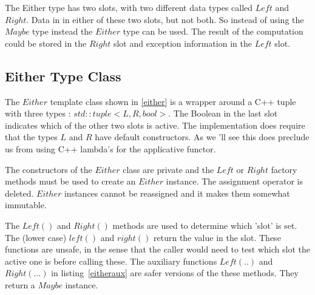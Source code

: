 \documentclass[12pt,fleqn]{article}
\begin{document}
The Either type has two slots, with two different data types called $Left$ and $Right$. 
Data in in either of these two slots, but not both.
So instead of using the $Maybe$ type instead the $Either$ type can be used. 
The result of the computation could be stored in the $Right$ slot and exception information in the $Left$ slot.

\subsection{Either Type Class}
%
%
%

The $Either$ template class shown in \ref{either} is a wrapper around a C++ tuple with three types : $std::tuple<L,R,bool>$.
The Boolean in the last slot indicates which of the other two slots is active.
The implementation does require that the types $L$ and $R$ have default constructors.
As we 'll see this does preclude us from using C++ lambda's for the applicative functor.

The constructors of the $Either$ class are private and the $Left$ or $Right$ factory methods must be used to create an $Either$ instance.
The assignment operator is deleted. 
$Either$ instances cannot be reassigned and it makes them somewhat immutable.

The $Left()$ and $Right()$ methods are used to determine which 'slot' is set.
The (lower case) $left()$ and $right()$ return the value in the slot.
These functions are unsafe, in the sense that the caller would need to test which slot the active one is before calling these.
The auxiliary functions $Left(..)$ and $Right(...)$ in listing~\ref{eitheraux} are safer versions of the these methods.
They return a $Maybe$ instance.
\end{document}

